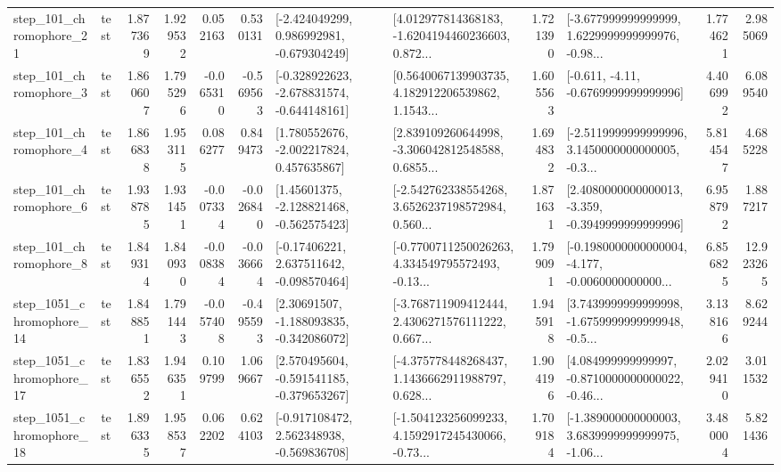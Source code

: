 \begin{tabular}{llrrrrllrlrr}
  step\_101\_chromophore\_21 &      test &      1.877369 &    1.929532 &      0.052163 &  0.530131 &   [-2.424049299, 0.986992981, -0.679304249] &  [4.012977814368183, -1.6204194460236603, 0.872... &       1.721390 &  [-3.677999999999999, 1.6229999999999976, -0.98... &            1.774621 &          2.985069 \\
   step\_101\_chromophore\_3 &      test &      1.860607 &    1.795296 &     -0.065310 & -0.569563 &  [-0.328922623, -2.678831574, -0.644148161] &  [0.5640067139903735, 4.182912206539862, 1.1543... &       1.605563 &               [-0.611, -4.11, -0.6769999999999996] &            4.406992 &          6.089540 \\
   step\_101\_chromophore\_4 &      test &      1.866838 &    1.953115 &      0.086277 &  0.849473 &    [1.780552676, -2.002217824, 0.457635867] &  [2.839109260644998, -3.306042812548588, 0.6855... &       1.694832 &  [-2.5119999999999996, 3.1450000000000005, -0.3... &            5.814547 &          4.685228 \\
   step\_101\_chromophore\_6 &      test &      1.938785 &    1.931451 &     -0.007334 & -0.026840 &    [1.45601375, -2.128821468, -0.562575423] &  [-2.542762338554268, 3.6526237198572984, 0.560... &       1.871631 &  [2.4080000000000013, -3.359, -0.3949999999999996] &            6.958792 &          1.887217 \\
   step\_101\_chromophore\_8 &      test &      1.849314 &    1.840930 &     -0.008384 & -0.036664 &    [-0.17406221, 2.637511642, -0.098570464] &  [-0.7700711250026263, 4.334549795572493, -0.13... &       1.799091 &  [-0.1980000000000004, -4.177, -0.0060000000000... &            6.856825 &         12.923265 \\
 step\_1051\_chromophore\_14 &      test &      1.848851 &    1.791443 &     -0.057408 & -0.495593 &    [2.30691507, -1.188093835, -0.342086072] &  [-3.768711909412444, 2.4306271576111222, 0.667... &       1.945918 &  [3.7439999999999998, -1.6759999999999948, -0.5... &            3.138166 &          8.629244 \\
 step\_1051\_chromophore\_17 &      test &      1.836552 &    1.946351 &      0.109799 &  1.069667 &   [2.570495604, -0.591541185, -0.379653267] &  [-4.375778448268437, 1.1436662911988797, 0.628... &       1.904196 &  [4.084999999999997, -0.8710000000000022, -0.46... &            2.029410 &          3.011532 \\
 step\_1051\_chromophore\_18 &      test &      1.896335 &    1.958537 &      0.062202 &  0.624103 &   [-0.917108472, 2.562348938, -0.569836708] &  [-1.504123256099233, 4.1592917245430066, -0.73... &       1.709184 &  [-1.389000000000003, 3.6839999999999975, -1.06... &            3.480004 &          5.821436 \\

\end{tabular}
